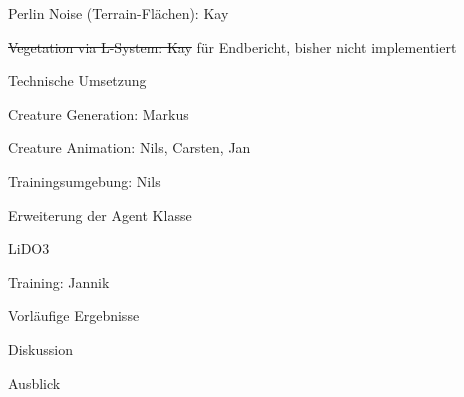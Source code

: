 \begin{thallok}
\begin{thallok}
\begin{thallok}
			\item Perlin Noise (Terrain-Flächen): Kay
			\item \sout{Vegetation via L-System: Kay} für Endbericht, bisher nicht implementiert
		\end{thallok}
	\end{thallok}
	\item Technische Umsetzung
	\begin{thallok}
		\item Creature Generation: Markus
		\item Creature Animation: Nils, Carsten, Jan
		\begin{thallok}
			\item Trainingsumgebung: Nils
			\item Erweiterung der Agent Klasse
			\item LiDO3
			\item Training: Jannik
		\end{thallok}
	\end{thallok}
	\item Vorläufige Ergebnisse
	\begin{thallok}
		\item Diskussion
	\end{thallok}
	\item Ausblick
\end{thallok}

